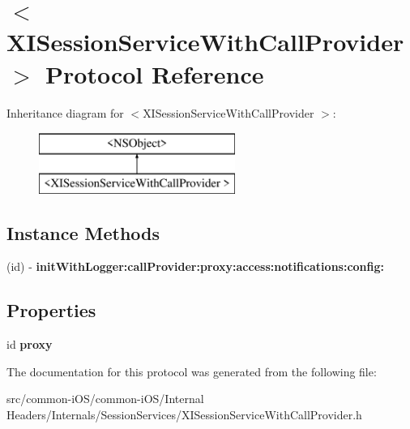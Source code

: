\hypertarget{protocol_x_i_session_service_with_call_provider_01-p}{}\section{$<$X\+I\+Session\+Service\+With\+Call\+Provider $>$ Protocol Reference}
\label{protocol_x_i_session_service_with_call_provider_01-p}
Inheritance diagram for $<$X\+I\+Session\+Service\+With\+Call\+Provider $>$\+:\begin{figure}[H]
\begin{center}
\leavevmode
\includegraphics[height=2.000000cm]{protocol_x_i_session_service_with_call_provider_01-p}
\end{center}
\end{figure}
\subsection*{Instance Methods}
\begin{DoxyCompactItemize}
\item 
\hypertarget{protocol_x_i_session_service_with_call_provider_01-p_a97f0e8477c198fc4780fc2d1ad4b1769}{}\label{protocol_x_i_session_service_with_call_provider_01-p_a97f0e8477c198fc4780fc2d1ad4b1769} 
(id) -\/ {\bfseries init\+With\+Logger\+:call\+Provider\+:proxy\+:access\+:notifications\+:config\+:}
\end{DoxyCompactItemize}
\subsection*{Properties}
\begin{DoxyCompactItemize}
\item 
\hypertarget{protocol_x_i_session_service_with_call_provider_01-p_ae3652534a5c4f7b2668e6c97a976a428}{}\label{protocol_x_i_session_service_with_call_provider_01-p_ae3652534a5c4f7b2668e6c97a976a428} 
id {\bfseries proxy}
\end{DoxyCompactItemize}


The documentation for this protocol was generated from the following file\+:\begin{DoxyCompactItemize}
\item 
src/common-\/i\+O\+S/common-\/i\+O\+S/\+Internal Headers/\+Internals/\+Session\+Services/X\+I\+Session\+Service\+With\+Call\+Provider.\+h\end{DoxyCompactItemize}
